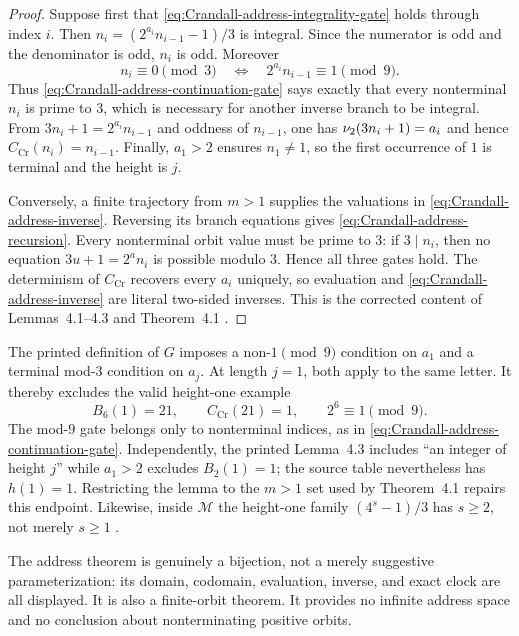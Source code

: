 \begin{proof}
Suppose first that \eqref{eq:Crandall-address-integrality-gate} holds through
index $i$.  Then $n_i=(2^{a_i}n_{i-1}-1)/3$ is integral.  Since the numerator
is odd and the denominator is odd, $n_i$ is odd.  Moreover
\[
 n_i\equiv0\pmod3
 \quad\Longleftrightarrow\quad
 2^{a_i}n_{i-1}\equiv1\pmod9.
\]
Thus \eqref{eq:Crandall-address-continuation-gate} says exactly that every
nonterminal $n_i$ is prime to $3$, which is necessary for another inverse
branch to be integral.  From
$3n_i+1=2^{a_i}n_{i-1}$ and oddness of $n_{i-1}$, one has
$\nu_{2}(3n_i+1)=a_i$ and hence $C_{\mathrm{Cr}}(n_i)=n_{i-1}$.  Finally,
$a_1>2$ ensures $n_1\ne1$, so the first occurrence of $1$ is terminal and
the height is $j$.

Conversely, a finite trajectory from $m>1$ supplies the valuations in
\eqref{eq:Crandall-address-inverse}.  Reversing its branch equations gives
\eqref{eq:Crandall-address-recursion}.  Every nonterminal orbit value must be
prime to $3$: if $3\mid n_i$, then no equation
$3u+1=2^a n_i$ is possible modulo $3$.  Hence all three gates hold.  The
determinism of $C_{\mathrm{Cr}}$ recovers every $a_i$ uniquely, so evaluation
and \eqref{eq:Crandall-address-inverse} are literal two-sided inverses.  This
is the corrected content of Lemmas~4.1--4.3 and Theorem~4.1
\cite[pp.~1284--1285]{Crandall1978}.
\end{proof}

\begin{sourceissue}
\label{sourceissue:Crandall-address-endpoints}
The printed definition of $G$ imposes a non-$1\pmod9$ condition on $a_1$
and a terminal mod-$3$ condition on $a_j$.  At length $j=1$, both apply to
the same letter.  It thereby excludes the valid height-one example
\[
 B_6(1)=21,
 \qquad C_{\mathrm{Cr}}(21)=1,
 \qquad 2^6\equiv1\pmod9.
\]
The mod-$9$ gate belongs only to nonterminal indices, as in
\eqref{eq:Crandall-address-continuation-gate}.  Independently, the printed
Lemma~4.3 includes ``an integer of height $j$'' while $a_1>2$ excludes
$B_2(1)=1$; the source table nevertheless has $h(1)=1$.  Restricting the
lemma to the $m>1$ set used by Theorem~4.1 repairs this endpoint.  Likewise,
inside $\mathcal M$ the height-one family $(4^s-1)/3$ has $s\geq2$, not
merely $s\geq1$ \cite[pp.~1282, 1284--1285]{Crandall1978}.
\end{sourceissue}

The address theorem is genuinely a bijection, not a merely suggestive
parameterization: its domain, codomain, evaluation, inverse, and exact clock
are all displayed.  It is also a finite-orbit theorem.  It provides no
infinite address space and no conclusion about nonterminating positive
orbits.

